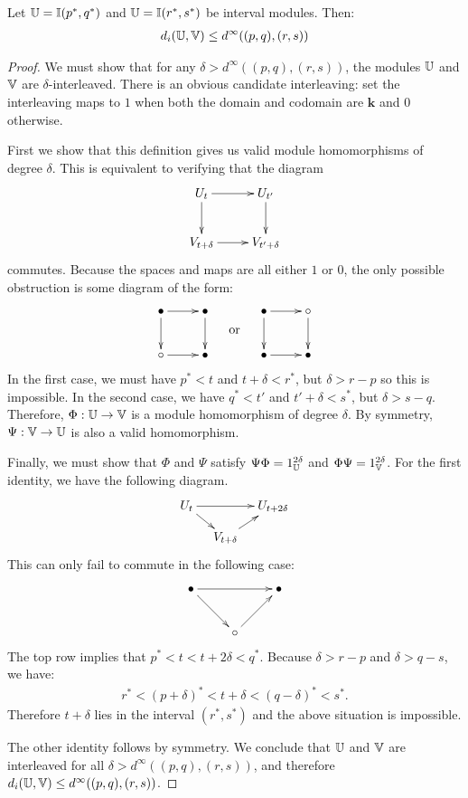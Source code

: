 \begin{proposition}
Let $\mathbb{U} = \mathbb{I}(p^*, q^*)$ and $\mathbb{U} = \mathbb{I}(r^*, s^*)$ be interval modules. Then:
\begin{align*}
d_i(\mathbb{U}, \mathbb{V}) \leq d^\infty((p, q), (r, s))
\end{align*}
\end{proposition}
\begin{proof}
We must show that for any $\delta > d^\infty((p, q), (r, s))$, the modules $\mathbb{U}$ and $\mathbb{V}$ are $\delta$-interleaved. There is an obvious candidate interleaving: set the interleaving maps to $1$ when both the domain and codomain are $\mathbf{k}$ and $0$ otherwise.

First we show that this definition gives us valid module homomorphisms of degree $\delta$. This is equivalent to verifying that the diagram
\begin{displaymath}
\xymatrix{
U_t \ar[d] \ar[r] & U_{t'} \ar[d]\\
V_{t+\delta} \ar[r] & V_{t'+\delta}
}
\end{displaymath}
commutes. Because the spaces and maps are all either $1$ or $0$, the only possible obstruction is some diagram of the form:
\begin{align*}
\xymatrix{
\bullet \ar[d] \ar[r] & \bullet \ar[d]\\
\circ \ar[r] & \bullet
}
\quad
\text{\raisebox{-15pt}{ or }}
\quad
\xymatrix{
\bullet \ar[d] \ar[r] & \circ \ar[d]\\
\bullet \ar[r] & \bullet
}
\end{align*}
In the first case, we must have $p^* < t$ and $t + \delta < r^*$, but $\delta > r-p$ so this is impossible. In the second case, we have $q^* < t'$ and $t' + \delta < s^*$, but $\delta > s-q$. Therefore, $\Phi : \mathbb{U} \to \mathbb{V}$ is a module homomorphism of degree $\delta$. By symmetry, $\Psi : \mathbb{V} \to \mathbb{U}$ is also a valid homomorphism.

Finally, we must show that $\Phi$ and $\Psi$ satisfy $\Psi \Phi = 1_{\mathbb{U}}^{2\delta}$ and $\Phi \Psi = 1_{\mathbb{V}}^{2\delta}$. For the first identity, we have the following diagram.
\begin{align*}
\xymatrix@=1em{
U_t \ar[dr] \ar[rr] & & U_{t+2\delta} \\
& V_{t+\delta} \ar[ur]
}
\end{align*}
This can only fail to commute in the following case:
\begin{align*}
\xymatrix{
\bullet \ar[dr] \ar[rr] & & \bullet \\
& \circ \ar[ur]
}
\end{align*}
The top row implies that $p^* < t < t+2\delta < q^*$. Because $\delta > r-p$ and $\delta > q - s$, we have:
\begin{align*}
r^* < (p+\delta)^* < t+\delta < (q-\delta)^* < s^*.
\end{align*}
Therefore $t+\delta$ lies in the interval $(r^*, s^*)$ and the above situation is impossible.

The other identity follows by symmetry. We conclude that $\mathbb{U}$ and $\mathbb{V}$ are interleaved for all $\delta > d^\infty((p, q), (r, s))$, and therefore $d_i(\mathbb{U}, \mathbb{V}) \leq d^\infty((p, q), (r, s))$.
\end{proof}

